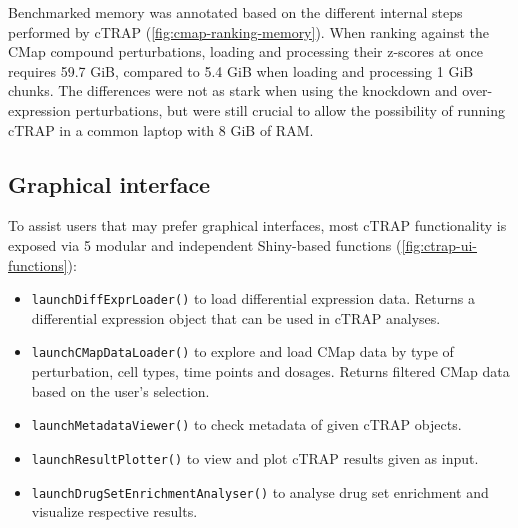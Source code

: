 Benchmarked memory was annotated based on the different internal steps performed by cTRAP (\autoref{fig:cmap-ranking-memory}). When ranking against the CMap compound perturbations, loading and processing their z-scores at once requires 59.7 GiB, compared to 5.4 GiB when loading and processing 1 GiB chunks. The differences were not as stark when using the knockdown and over-expression perturbations, but were still crucial to allow the possibility of running cTRAP in a common laptop with 8 GiB of RAM. %

\subsection{Graphical interface}

To assist users that may prefer graphical interfaces, most cTRAP functionality is exposed via 5 modular and independent Shiny-based functions (\autoref{fig:ctrap-ui-functions}):

\begin{itemize}
	\item \texttt{launchDiffExprLoader()} to load differential expression data. Returns a differential expression object that can be used in cTRAP analyses.
	\item \texttt{launchCMapDataLoader()} to explore and load CMap data by type of perturbation, cell types, time points and dosages. Returns filtered CMap data based on the user's selection.
	\item \texttt{launchMetadataViewer()} to check metadata of given cTRAP objects.
	\item \texttt{launchResultPlotter()} to view and plot cTRAP results given as input.
	\item \texttt{launchDrugSetEnrichmentAnalyser()} to analyse drug set enrichment and visualize respective results.
\end{itemize}

